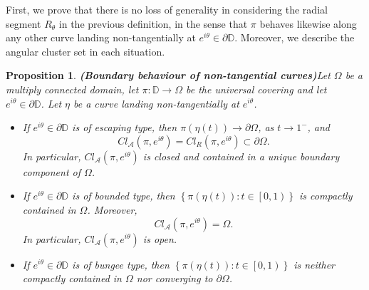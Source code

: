 \documentclass[11pt,a4paper,reqno]{amsart}
\theoremstyle{plain}
\newtheorem{prop}[thm]{Proposition}
\theoremstyle{definition}
\theoremstyle{plain}
\begin{document}
First, we prove that there is no loss of generality in considering the radial segment $ R_\theta $ in the previous definition, in the sense that $ \pi $ behaves likewise along any other curve  landing non-tangentially at $ e^{i\theta}\in\partial \mathbb{D} $. Moreover, we describe the angular cluster set in each situation.
\begin{prop}{\bf (Boundary behaviour of non-tangential curves)}\label{prop-escaping-bounded-bungee}	Let $ \Omega $ be a multiply connected domain,  let $ \pi\colon\mathbb{D}\to \Omega $ be the universal covering and let $ e^{i\theta}\in\partial\mathbb{D} $. 
	Let $ \eta $ be a curve landing non-tangentially at $ e^{i\theta}$.
		\begin{itemize}
		\item  If $ e^{i\theta}\in\partial \mathbb{D} $ is of {escaping} type, then $ \pi(\eta (t))\to\partial \Omega $, as $ t\to 1^{-} $, and
		\[ Cl_{\mathcal{A}}(\pi, e^{i\theta})= Cl_{R}(\pi, e^{i\theta})\subset \partial \Omega. \] In particular, $ Cl_{\mathcal{A}}(\pi, e^{i\theta}) $ is closed and contained in a unique boundary component of $\Omega$.
		\item If  $ e^{i\theta}\in\partial \mathbb{D} $ is of bounded type, then $\left\lbrace  \pi(\eta (t))\colon t\in \left[ 0,1\right) \right\rbrace  $ is compactly contained in $ \Omega $. Moreover,
		\[ Cl_{\mathcal{A}}(\pi, e^{i\theta})=  \Omega. \] In particular, $ Cl_{\mathcal{A}}(\pi, e^{i\theta}) $ is open.
		\item If $ e^{i\theta}\in\partial \mathbb{D} $ is of {bungee} type, then $\left\lbrace  \pi(\eta (t))\colon t\in \left[ 0,1\right) \right\rbrace  $ is neither compactly contained in $ \Omega $ nor converging to $ \partial \Omega $.
	\end{itemize}
\end{prop}
\end{document}
